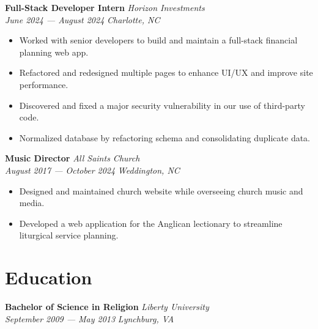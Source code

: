 \documentclass[letterpaper, 11pt]{article}
\begin{document}
\noindent
\textbf{Full-Stack Developer Intern}
\hfill \textit{Horizon Investments} \\
\textit{June 2024 — August 2024}
\hfill \textit{Charlotte, NC}
\begin{itemize}
\item Worked with senior developers to build and maintain a full-stack
  financial planning web app.
\item Refactored and redesigned multiple pages to enhance UI/UX and
  improve site performance.
\item Discovered and fixed a major security vulnerability in our use
  of third-party code.
\item Normalized database by refactoring schema and consolidating
  duplicate data.
\end{itemize}

\noindent
\textbf{Music Director}
\hfill \textit{All Saints Church} \\
\textit{August 2017 — October 2024}
\hfill \textit{Weddington, NC}
\begin{itemize}
\item Designed and maintained church website while overseeing church
  music and media.
\item Developed a web application for the Anglican lectionary to
  streamline liturgical service planning.
\end{itemize}


\section*{Education}
\textbf{Bachelor of Science in Religion}
\hfill \textit{Liberty University} \\
\textit{September 2009 — May 2013}
\hfill \textit{Lynchburg, VA}
\end{document}
